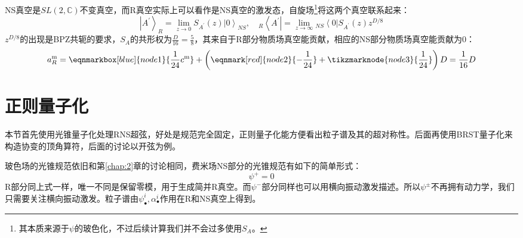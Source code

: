NS真空是$SL(2,\mathbb{C})$不变真空，而R真空实际上可以看作是NS真空的激发态，自旋场\footnote{其本质来源于$\psi$的玻色化\cite{Blumenhagen:2013fgp,Schlotterer:2012zz}，不过后续计算我们并不会过多使用$S_A$。}将这两个真空联系起来：
\begin{equation}
	\left|A^{\prime}\right\rangle_{R}=\lim_{z\to 0}S_{{A^{\prime}}}(z)\left|0\right\rangle_{NS},\quad 
	{}_R\left\langle A^{\prime}\right|=\lim_{z\to\infty}{}_{NS}\left\langle0\right|S_{{A^{\prime}}}(z)z^{D/8}
\end{equation}
$z^{D/8}$的出现是BPZ共轭的要求\cite{itocft}，$S_A$的共形权为$\frac{D}{16}=\frac58$，其来自于R部分物质场真空能贡献，相应的NS部分物质场真空能贡献为0：
\vspace{1.5em}%
\begin{equation}
	\label{eq:3.12}
	a^{\mathrm{m}}_R=
	\eqnmarkbox[blue]{node1}{\frac{1}{24}c^{\mathrm{m}}}+
	\left(\eqnmark[red]{node2}{-\frac{1}{24}}+\tikzmarknode{node3}{\frac{1}{24}}\right)D=\frac{1}{16}D
\end{equation}
\section{正则量子化}
本节首先使用光锥量子化处理RNS超弦，好处是规范完全固定，正则量子化能方便看出粒子谱及其的超对称性。后面再使用BRST量子化来构造协变的顶角算符，后面的讨论以开弦为例。

玻色场的光锥规范依旧和第\ref{chap:2}章的讨论相同，费米场NS部分的光锥规范有如下的简单形式：
\begin{equation}
	\psi^+ = 0
\end{equation}
R部分同上式一样，唯一不同是保留零模，用于生成简并R真空。而$\psi^-$部分同样也可以用横向振动激发描述。所以$\psi^\pm$不再拥有动力学，我们只需要关注横向振动激发。粒子谱由$\psi^i_\bullet,\alpha^i_\bullet$作用在R和NS真空上得到。


